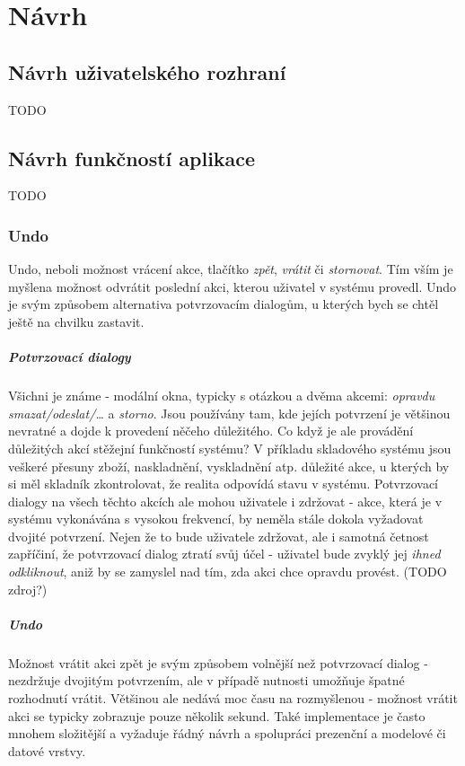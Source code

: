 \chapter{Návrh}

\section{Návrh uživatelského rozhraní}

TODO


\section{Návrh funkčností aplikace}

TODO

\subsection{Undo}

Undo, neboli možnost vrácení akce, tlačítko \emph{zpět}, \emph{vrátit} či \emph{stornovat}. Tím vším je myšlena možnost odvrátit poslední akci, kterou uživatel v systému provedl. Undo je svým způsobem alternativa potvrzovacím dialogům, u kterých bych se chtěl ještě na chvilku zastavit.

\paragraph{Potvrzovací dialogy} Všichni je známe - modální okna, typicky s otázkou a dvěma akcemi: \emph{opravdu smazat/odeslat/\ldots} a \emph{storno}. Jsou používány tam, kde jejích potvrzení je většinou nevratné a dojde k provedení něčeho důležitého. Co když je ale provádění důležitých akcí stěžejní funkčností systému? V příkladu skladového systému jsou veškeré přesuny zboží, naskladnění, vyskladnění atp. důležité akce, u kterých by si měl skladník zkontrolovat, že realita odpovídá stavu v systému. Potvrzovací dialogy na všech těchto akcích ale mohou uživatele i zdržovat - akce, která je v systému vykonávána s vysokou frekvencí, by neměla stále dokola vyžadovat dvojité potvrzení. Nejen že to bude uživatele zdržovat, ale i samotná četnost zapříčiní, že potvrzovací dialog ztratí svůj účel - uživatel bude zvyklý jej \emph{ihned odkliknout}, aniž by se zamyslel nad tím, zda akci chce opravdu provést. (TODO zdroj?)

\paragraph{Undo} Možnost vrátit akci zpět je svým způsobem volnější než potvrzovací dialog - nezdržuje dvojitým potvrzením, ale v případě nutnosti umožňuje špatné rozhodnutí vrátit. Většinou ale nedává moc času na rozmyšlenou - možnost vrátit akci se typicky zobrazuje pouze několik sekund. Také implementace je často mnohem složitější a vyžaduje řádný návrh a spolupráci prezenční a modelové či datové vrstvy.

